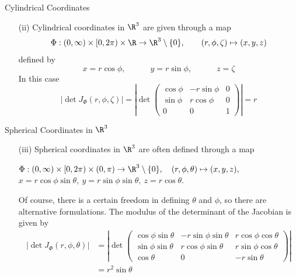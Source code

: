 \documentclass[smaller,hyperref={CJKbookmarks=true}]{beamer}
\begin{document}
\begin{frame}[c]{Cylindrical Coordinates}
\begin{spacing}{1.1}
\begin{itemize}
  \item[(ii)] Cylindrical coordinates in $\R^3$ are given through a map
      \[\Phi:(0,\infty)\times[0,2\pi)\times\R\to\R^3\setminus\{0\},\qquad
      (r,\phi,\zeta)\mapsto(x,y,z)\]
      defined by
      \[x=r\cos\phi,\qquad\quad y=r\sin\phi,\qquad\quad z=\zeta\]
      In this case
      \[|\det J_\Phi(r,\phi,\zeta)|=\left|\det\begin{pmatrix}
                                        \cos\phi &-r\sin\phi &0 \\
                                        \sin\phi &r\cos\phi &0 \\
                                        0 &0 & 1
                                      \end{pmatrix}\right|=r\]

\end{itemize}
\end{spacing}
\end{frame}
\begin{frame}[t]{Spherical Coordinates in $\R^3$}
\begin{spacing}{1.2}
\begin{itemize}
  \item[(iii)] Spherical coordinates in $\R^3$ are often defined through a map
      \begin{center}
        $\Phi:(0,\infty)\times[0,2\pi)\times(0,\pi)\to\R^3\setminus\{0\},\quad
        (r,\phi,\theta)\mapsto(x,y,z),$\\
        $x=r\cos\phi\sin\theta,~y=r\sin\phi\sin\theta,~z=r\cos\theta$.
      \end{center}
      Of course, there is a certain freedom in defining $\theta$ and $\phi$, so there are
alternative formulations. The modulus of the determinant of the
Jacobian is given by
\begin{equation*}
  \begin{split}
     |\det J_\Phi(r,\phi,\theta)| &=\left|\det\begin{pmatrix}
                   \cos\phi\sin\theta & -r\sin\phi\sin\theta & r\cos\phi\cos\theta \\
                   \sin\phi\sin\theta & r\cos\phi\sin\theta & r\sin\phi\cos\theta \\
                   \cos\theta & 0 & -r\sin\theta
                 \end{pmatrix}\right| \\
       &=r^2\sin\theta
  \end{split}
\end{equation*}
\end{itemize}
\end{spacing}
\end{frame}
\end{document}
